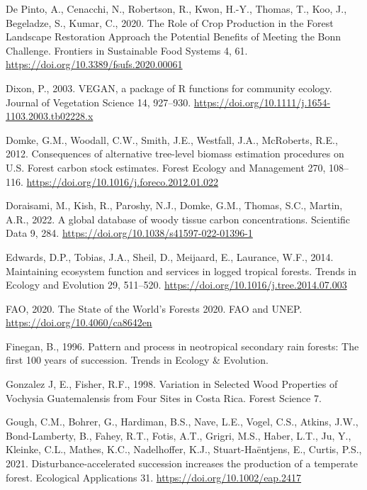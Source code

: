 \documentclass[
  12pt,
]{article}
\newlength{\cslhangindent}
\newlength{\cslentryspacingunit} %
\newenvironment{CSLReferences}[2] %
 {%
  \setlength{\parindent}{0pt}
  \ifodd #1
  \let\oldpar\par
  \def\par{\hangindent=\cslhangindent\oldpar}
  \fi
  \setlength{\parskip}{#2\cslentryspacingunit}
 }%
 {}
\begin{document}
\begin{CSLReferences}{1}{0}
\leavevmode{}%
De Pinto, A., Cenacchi, N., Robertson, R., Kwon, H.-Y., Thomas, T., Koo, J., Begeladze, S., Kumar, C., 2020. The {Role} of {Crop Production} in the {Forest Landscape Restoration Approach} the {Potential Benefits} of {Meeting} the {Bonn Challenge}. Frontiers in Sustainable Food Systems 4, 61. \url{https://doi.org/10.3389/fsufs.2020.00061}

\leavevmode{}%
Dixon, P., 2003. {VEGAN}, a package of {R} functions for community ecology. Journal of Vegetation Science 14, 927--930. \url{https://doi.org/10.1111/j.1654-1103.2003.tb02228.x}

\leavevmode{}%
Domke, G.M., Woodall, C.W., Smith, J.E., Westfall, J.A., McRoberts, R.E., 2012. Consequences of alternative tree-level biomass estimation procedures on {U}.{S}. Forest carbon stock estimates. Forest Ecology and Management 270, 108--116. \url{https://doi.org/10.1016/j.foreco.2012.01.022}

\leavevmode{}%
Doraisami, M., Kish, R., Paroshy, N.J., Domke, G.M., Thomas, S.C., Martin, A.R., 2022. A global database of woody tissue carbon concentrations. Scientific Data 9, 284. \url{https://doi.org/10.1038/s41597-022-01396-1}

\leavevmode{}%
Edwards, D.P., Tobias, J.A., Sheil, D., Meijaard, E., Laurance, W.F., 2014. Maintaining ecosystem function and services in logged tropical forests. Trends in Ecology and Evolution 29, 511--520. \url{https://doi.org/10.1016/j.tree.2014.07.003}

\leavevmode{}%
FAO, 2020. The {State} of the {World}'s {Forests} 2020. {FAO and UNEP}. \url{https://doi.org/10.4060/ca8642en}

\leavevmode{}%
Finegan, B., 1996. Pattern and process in neotropical secondary rain forests: The first 100 years of succession. Trends in Ecology \& Evolution.

\leavevmode{}%
Gonzalez J, E., Fisher, R.F., 1998. Variation in {Selected Wood Properties} of {Vochysia Guatemalensis} from {Four Sites} in {Costa Rica}. Forest Science 7.

\leavevmode{}%
Gough, C.M., Bohrer, G., Hardiman, B.S., Nave, L.E., Vogel, C.S., Atkins, J.W., Bond-Lamberty, B., Fahey, R.T., Fotis, A.T., Grigri, M.S., Haber, L.T., Ju, Y., Kleinke, C.L., Mathes, K.C., Nadelhoffer, K.J., Stuart-Haëntjens, E., Curtis, P.S., 2021. Disturbance-accelerated succession increases the production of a temperate forest. Ecological Applications 31. \url{https://doi.org/10.1002/eap.2417}


\end{CSLReferences}
\end{document}
